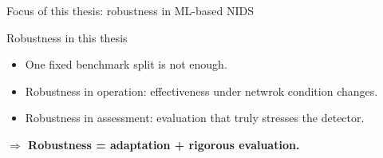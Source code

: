 \begin{frame}{Focus of this thesis: robustness in ML-based NIDS}
	\small

	\vfill
	\begin{block}{Robustness in this thesis}
		\begin{itemize}
			\setlength\itemsep{0.6em}
			\item One fixed benchmark split is not enough.
			\item Robustness in operation: effectiveness under netwrok condition changes.
			\item Robustness in assessment: evaluation that truly stresses the detector.
		\end{itemize}

		\vspace{0.35em}
		\centering
		\textbf{$\Rightarrow$ Robustness = adaptation + rigorous evaluation.}
	\end{block}
	\vfill

\end{frame}



